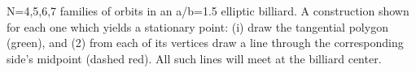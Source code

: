 N=4,5,6,7 families of orbits in an a/b=1.5 elliptic billiard. A construction shown for each one which yields a stationary point: (i) draw the tangential polygon (green), and (2) from each of its vertices draw a line through the corresponding side's midpoint (dashed red). All such lines will meet at the billiard center.